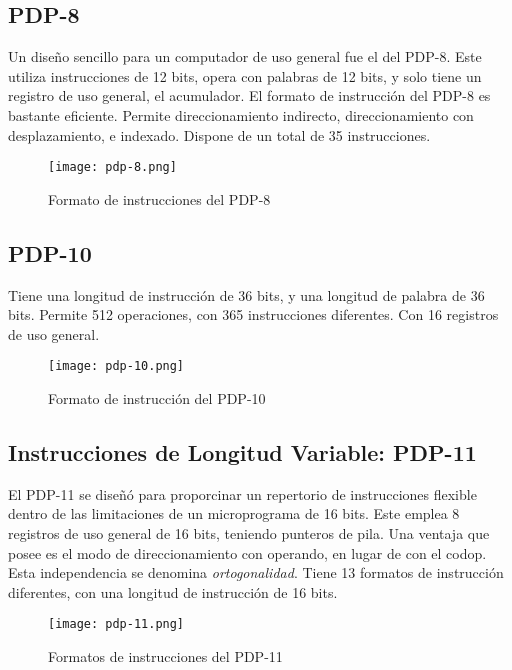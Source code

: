 \documentclass{article}
\begin{document}
\subsection*{PDP-8}
Un dise\~{n}o sencillo para un computador de uso general fue el del PDP-8.
Este utiliza instrucciones de 12 bits, opera con palabras de 12 bits, y solo
tiene un registro de uso general, el acumulador. El formato de instrucci\'{o}n
del PDP-8 es bastante eficiente. Permite direccionamiento indirecto, direccionamiento
con desplazamiento, e indexado. Dispone de un total de 35 instrucciones.

\begin{figure}[h]
    \centering
    \texttt{[image: pdp-8.png]}
    \caption{Formato de instrucciones del PDP-8
        \cite{stallings2006organización}}
    \label{fig:formato-instruccion-pdp8}
\end{figure}

\subsection*{PDP-10}
Tiene una longitud de instrucci\'{o}n de 36 bits, y una longitud de palabra de
36 bits. Permite 512 operaciones, con 365 instrucciones diferentes. Con 16
registros de uso general.

\begin{figure}[h]
    \centering
    \texttt{[image: pdp-10.png]}
    \caption{Formato de instrucci\'{o}n del PDP-10
    \cite{stallings2006organización}}
    \label{fig:formato-instruccion-pdp10}
\end{figure}


\subsection*{Instrucciones de Longitud Variable: PDP-11}
El PDP-11 se dise\~{n}\'{o} para proporcinar un repertorio de instrucciones
flexible dentro de las limitaciones de un microprograma de 16 bits. Este emplea
8 registros de uso general de 16 bits, teniendo punteros de pila. Una ventaja
que posee es el modo de direccionamiento con operando, en lugar de con el codop.
Esta independencia se denomina \textit{ortogonalidad}. Tiene 13 formatos de
instrucci\'{o}n diferentes, con una longitud de instrucci\'{o}n de 16 bits.

\begin{figure}[h]
    \centering
    \texttt{[image: pdp-11.png]}
    \caption{Formatos de instrucciones del PDP-11
        \cite{stallings2006organización}}
    \label{fig:formato-instruccion-pdp11}
\end{figure}
\end{document}
